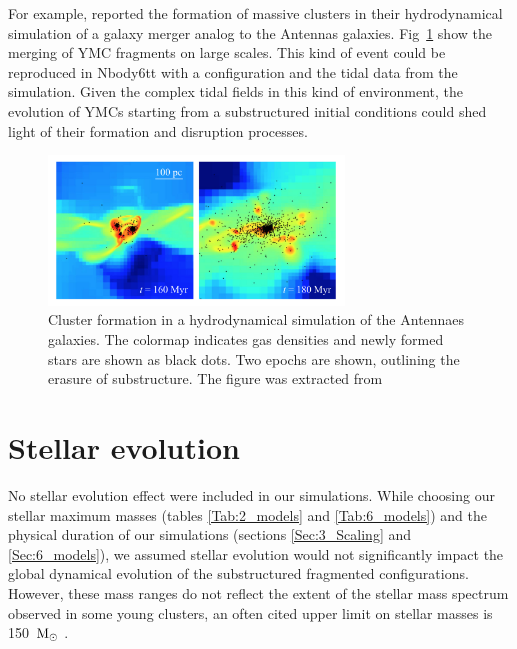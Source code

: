For example, \cite{Renaud2015b} reported the formation of massive clusters in their hydrodynamical simulation of a galaxy merger analog to the Antennas galaxies. Fig~\ref{Fig:7_renaud} show the merging of YMC fragments on large scales. This kind of event could be reproduced in Nbody6tt with a \HubLem configuration and the tidal data from the simulation. Given the complex tidal fields in this kind of environment, the evolution of YMCs starting from a substructured initial conditions could shed light of their formation and disruption processes.


\begin{figure}
\begin{center}
\includegraphics[width=0.7\textwidth]{Figures/7_renaudantennas.png}
\end{center}
\caption{Cluster formation in a hydrodynamical simulation of the Antennaes galaxies. The colormap indicates gas densities and newly formed stars are shown as black dots. Two epochs are shown, outlining the erasure of substructure. The figure was extracted from \cite{Renaud2015b} }
\label{Fig:7_renaud}
\end{figure} 



\section{Stellar evolution}





No stellar evolution effect were included in our simulations. While choosing our stellar maximum masses (tables \ref{Tab:2_models} and \ref{Tab:6_models}) and the physical duration of our simulations (sections \ref{Sec:3_Scaling} and \ref{Sec:6_models}), we assumed stellar evolution would not significantly impact the global dynamical evolution of the substructured fragmented configurations. However, these mass ranges do not reflect the extent of the stellar mass spectrum observed in some young clusters, an often cited upper limit on stellar masses is 150~${\textrm{M}_\odot}$ \citep{Oey2005}.

